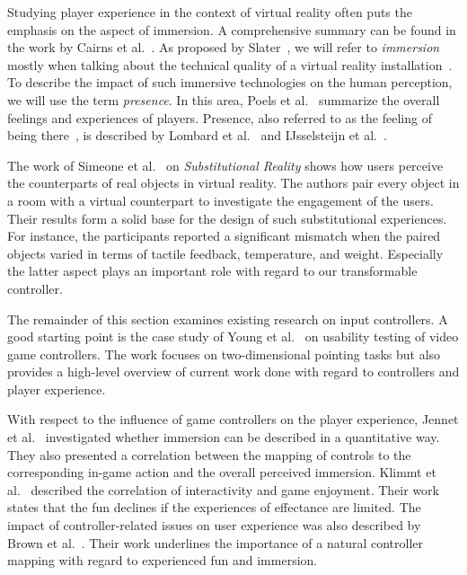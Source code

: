 \documentclass{sigchi}
\begin{document}
Studying player experience in the context of virtual reality often puts the emphasis on the aspect of immersion. A comprehensive summary can be found in the work by Cairns et al.~\cite{cairns2014immersion}. As proposed by Slater~\cite{slater2003note}, we will refer to \textit{immersion} mostly when talking about the technical quality of a virtual reality installation~\cite{Biocca:1995:IVR:207922.207926, sherman2002understanding}. To describe the impact of such immersive 
technologies on the human perception, we will use the term \textit{presence}. In this area, Poels et al.~\cite{Poels:2007:ALF:1328202.1328218} summarize the overall feelings and experiences of players. Presence, also referred to as the feeling of being there~\cite{heeter1992being}, is described by Lombard et al.~\cite{lombard1997heart} and IJsselsteijn et al.~\cite{IJsselsteijn}. 

The work of Simeone et al.~\cite{Simeone:2015:SRU:2702123.2702389} on \textit{Substitutional Reality} shows how users perceive the counterparts of real objects in virtual reality. The authors pair every object in a room with a virtual counterpart to investigate the engagement of the users. Their results form a solid base for the design of such substitutional experiences. For instance, the participants reported a significant mismatch when the paired objects varied in terms of tactile feedback, temperature, and weight. Especially the latter aspect plays an important role with regard to our transformable controller. 

The remainder of this section examines existing research on input controllers. A good starting point is the case study of Young et al.~\cite{young2016usability} on usability testing of video game controllers. The work focuses on two-dimensional pointing tasks but also provides a high-level overview of current work done with regard to controllers and player experience.

With respect to the influence of game controllers on the player experience, Jennet et al.~\cite{jennett2008measuring} investigated whether immersion can be described in a quantitative way. They also presented a correlation between the mapping of controls to the corresponding in-game action and the overall perceived immersion. Klimmt et al.~\cite{klimmt2007effectance} described the correlation of interactivity and game enjoyment. Their work states that the fun declines if the experiences of effectance are limited. The impact of controller-related issues on user experience was also described by Brown et al.~\cite{brown2015beyond}. Their work underlines the importance of a natural controller mapping with regard to experienced fun and immersion.
\end{document}
